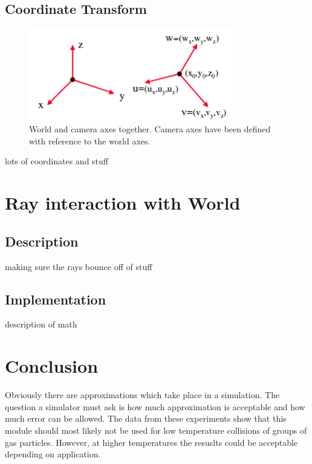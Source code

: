 \documentclass{article}
\begin{document}
\subsection{Coordinate Transform}
\begin{figure}[!t]
\centering
\includegraphics[width=3.5in]{./imgs/axes}
\caption{World and camera axes together. Camera axes have been defined with reference to the world axes.}
\label{fig:axes}
\end{figure}


lots of coordinates and stuff

\section{Ray interaction with World}
\subsection{Description}
making sure the rays bounce off of stuff

\subsection{Implementation}

description of math

\section{Conclusion}
Obviously there are approximations which take place in a simulation. The question a simulator must ask is how
much approximation is acceptable and how much error can be allowed. The data from these experiments show that this
module should most likely not be used for low temperature collisions of groups of gas particles. However, at higher
temperatures the resuslts could be acceptable depending on application.
\end{document}
